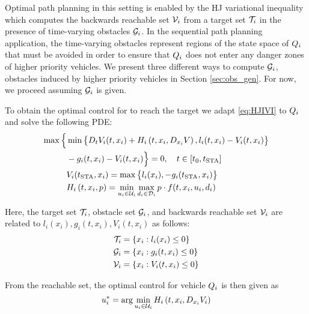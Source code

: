 Optimal path planning in this setting is enabled by the HJ variational inequality which computes the backwards reachable set $\mathcal{V}_i$ from a target set $\mathcal{T}_i$ in the presence of time-varying obstacles $\mathcal{G}_i$. In the sequential path planning application, the time-varying obstacles represent regions of the state space of $Q_i$ that must be avoided in order to ensure that $Q_i$ does not enter any danger zones of higher priority vehicles. We present three different ways to compute $\mathcal{G}_i$, obstacles induced by higher priority vehicles in Section \ref{sec:obs_gen}. For now, we proceed assuming $\mathcal{G}_i$ is given.

To obtain the optimal control for to reach the target we adapt \eqref{eq:HJIVI} to $Q_i$ and solve the following PDE:
%
\begin{equation}
\label{eq:HJIVI_i}
\begin{aligned}
\max\Big\{&\min\big\{D_t V_i(t, x_i) + H_i\left(t, x_i, D_{x_i} V\right), l_i(t, x_i) - V_i(t, x_i)\big\}\\
& -g_i(t, x_i) - V_i(t, x_i)\Big\} = 0, \quad t \in [t_0, t_\text{STA}]\\
&V_i(t_\text{STA}, x_i) = \max\big\{l_i(x_i), -g_i(t_\text{STA}, x_i)\big\} \\
&H_i\left(t, x_i, p\right) = \min_{u_i \in \mathcal{U}_i} \max_{d_i \in \mathcal{D}_i} p \cdot f(t, x_i, u_i, d_i)
\end{aligned}
\end{equation}

Here, the target set $\mathcal{T}_i$, obstacle set $\mathcal{G}_i$, and backwards reachable set $\mathcal{V}_i$ are related to $l_i(x_i), g_i(t, x_i), V_i(t, x_i)$ as follows:
%
\begin{equation}
\begin{aligned}
\mathcal{T}_i &= \{x_i: l_i(x_i) \le 0\} \\
\mathcal{G}_i &= \{x_i: g_i(t, x_i) \le 0\} \\
\mathcal{V}_i &= \{x_i: V_i(t, x_i) \le 0\}
\end{aligned}
\end{equation}

From the reachable set, the optimal control for vehicle $Q_i$ is then given as
\begin{equation}
\label{eq:opt_ctrl_i}
u_i^* = \arg \min_{u_i \in \mathcal{U}_i} H_i\left(t, x_i, D_{x_i} V_i\right)
\end{equation}